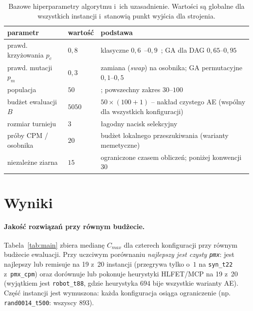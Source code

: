 \documentclass[pdflatex,sn-mathphys,Numbered]{sn-jnl}
\begin{document}
\begin{table}[ht]
\centering\footnotesize\setlength{\tabcolsep}{6pt}
\begin{tabular}{llp{8.0cm}}
\toprule
parametr & wartość & podstawa \\
\midrule
prawd. krzyżowania $p_c$ & $0{,}8$ & klasyczne $0{,}6$~\cite{dejong1990}--$0{,}9$~\cite{grefenstette1986}; GA dla DAG $0{,}65$--$0{,}95$~\cite{omara2010, hou1994} \\
prawd. mutacji $p_m$ & $0{,}3$ & zamiana (\textit{swap}) na osobnika; GA permutacyjne $0{,}1$--$0{,}5$ \\
populacja & $50$ & \cite{dejong1990}; powszechny zakres $30$--$100$ \\
budżet ewaluacji $B$ & $5050$ & $50\times(100+1)$ -- nakład czystego AE (wspólny dla wszystkich konfiguracji) \\
rozmiar turnieju & $3$ & łagodny nacisk selekcyjny~\cite{miller1995} \\
próby CPM / osobnika & $20$ & budżet lokalnego przeszukiwania (warianty memetyczne) \\
niezależne ziarna & $15$ & ograniczone czasem obliczeń; poniżej konwencji $30$ \\
\bottomrule
\end{tabular}
\caption{Bazowe hiperparametry algorytmu i~ich uzasadnienie. Wartości są globalne
dla wszystkich instancji i~stanowią punkt wyjścia dla strojenia.}
\label{tab:hparams}
\end{table}

\section{Wyniki}
\label{sec:wyniki}
\paragraph{Jakość rozwiązań przy równym budżecie.}
Tabela~\ref{tab:main} zbiera medianę $C_{max}$ dla czterech konfiguracji przy
równym budżecie ewaluacji. Przy uczciwym porównaniu \emph{najlepszy jest czysty
\texttt{pmx}}: jest najlepszy lub remisuje na 19 z~20 instancji (przegrywa tylko
o~$1$ na \texttt{syn\_t22} z~\texttt{pmx\_cpm}) oraz dorównuje lub pokonuje
heurystyki HLFET/MCP na 19 z~20 (wyjątkiem jest \texttt{robot\_t88}, gdzie
heurystyka $694$ bije wszystkie warianty AE). Część instancji jest wymuszona:
każda konfiguracja osiąga ograniczenie (np. \texttt{rand0014\_t500}: wszyscy $893$).
\end{document}
